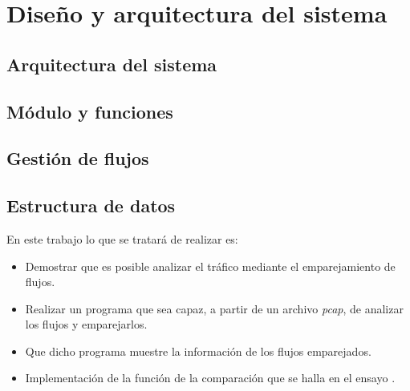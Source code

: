 \chapter{Diseño y arquitectura del sistema}

\section{Arquitectura del sistema}

\section{Módulo y funciones}

\section{Gestión de flujos}

\section{Estructura de datos}




En este trabajo lo que se tratará de realizar es:
\begin{itemize}
\item Demostrar que es posible analizar el tráfico mediante el emparejamiento de flujos.
\item Realizar un programa que sea capaz, a partir de un archivo \textit{pcap}, de analizar los flujos y emparejarlos.
\item Que dicho programa muestre la información de los flujos emparejados.
\item Implementación de la función de la comparación que se halla en el ensayo \cite{comparacion}.
\end{itemize}

